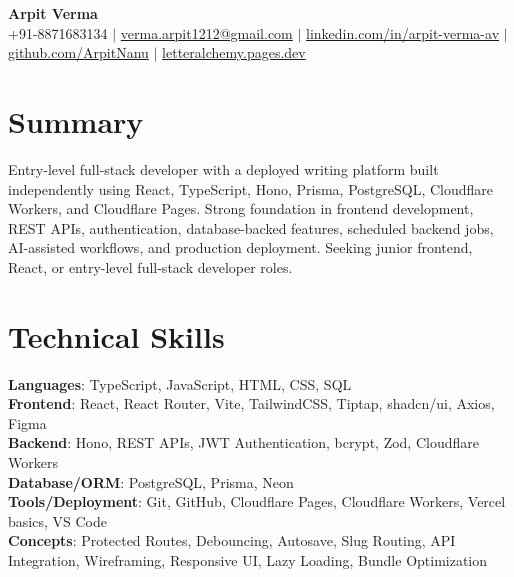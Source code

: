 \documentclass[letterpaper,11pt]{article}
\begin{document}
\begin{center}
    {\Huge \textbf{Arpit Verma}} \\ \vspace{1pt}
    \small
    +91-8871683134 $|$
    \href{mailto:verma.arpit1212@gmail.com}{verma.arpit1212@gmail.com} $|$
    \href{https://www.linkedin.com/in/arpit-verma-av}{linkedin.com/in/arpit-verma-av} $|$
    \href{https://github.com/ArpitNanu}{github.com/ArpitNanu} $|$
    \href{https://letteralchemy.pages.dev}{letteralchemy.pages.dev}
\end{center}

\section{Summary}
\small{
Entry-level full-stack developer with a deployed writing platform built independently using React, TypeScript, Hono, Prisma, PostgreSQL, Cloudflare Workers, and Cloudflare Pages. Strong foundation in frontend development, REST APIs, authentication, database-backed features, scheduled backend jobs, AI-assisted workflows, and production deployment. Seeking junior frontend, React, or entry-level full-stack developer roles.
}

\section{Technical Skills}
\begin{itemize}[leftmargin=0.15in, label={}]
  \small{\item{
    \textbf{Languages}{: TypeScript, JavaScript, HTML, CSS, SQL} \\
    \textbf{Frontend}{: React, React Router, Vite, TailwindCSS, Tiptap, shadcn/ui, Axios, Figma} \\
    \textbf{Backend}{: Hono, REST APIs, JWT Authentication, bcrypt, Zod, Cloudflare Workers} \\
    \textbf{Database/ORM}{: PostgreSQL, Prisma, Neon} \\
    \textbf{Tools/Deployment}{: Git, GitHub, Cloudflare Pages, Cloudflare Workers, Vercel basics, VS Code} \\
    \textbf{Concepts}{: Protected Routes, Debouncing, Autosave, Slug Routing, API Integration, Wireframing, Responsive UI, Lazy Loading, Bundle Optimization}
  }}
\end{itemize}

\end{document}
